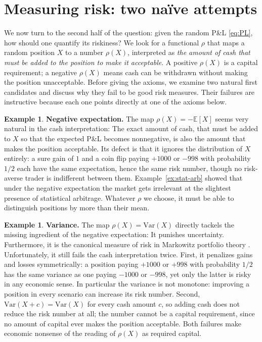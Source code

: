 \documentclass[11pt,a4paper]{report}
\numberwithin{equation}{chapter}
\theoremstyle{plain}
\theoremstyle{definition}
\newtheorem{example}[proposition]{Example}
\newcommand{\E}{\mathbb{E}}
\begin{document}
\section{Measuring risk: two na\"ive attempts}\label{sec:naive}

We now turn to the second half of the question: given the random P\&L \eqref{eq:PL}, how should one quantify its riskiness? We look for a functional $\rho$ that maps a random position $X$ to a number $\rho(X)$, interpreted as \emph{the amount of cash that must be added to the position to make it acceptable}. A positive $\rho(X)$ is a capital requirement; a negative $\rho(X)$ means cash can be withdrawn without making the position unacceptable. Before giving the axioms, we examine two natural first candidates and discuss why they fail to be good risk measures. Their failures are instructive because each one points directly at one of the axioms below.

\begin{example}\label{ex:neg-exp}
    \textbf{Negative expectation.}
    The map $\rho(X)=-\E[X]$ seems very natural in the cash interpretation: The exact amount of cash, that must be added to $X$ so that the expected P\&L becomes nonnegative, is also the amount that makes the position acceptable. Its defect is that it ignores the distribution of $X$ entirely: a sure gain of $1$ and a coin flip paying $+1000$ or $-998$ with probability $1/2$ each have the same expectation, hence the same risk number, though no risk-averse trader is indifferent between them. Example~\ref{ex:stat-arb} showed that under the negative expectation the market gets irrelevant at the slightest presence of statistical arbitrage. Whatever $\rho$ we choose, it must be able to distinguish positions by more than their mean.
\end{example}

\begin{example}\label{ex:variance}
    \textbf{Variance.}
    The map $\rho(X)=\mathrm{Var}(X)$ directly tackels the missing ingredient of the negative expectation: It punishes uncertainty. Furthermore, it is the canonical measure of risk in Markowitz portfolio theory \cite{markowitz1952}. Unfortunately, it still fails the cash interpretation twice. First, it penalizes gains and losses symmetrically: a position paying $+1000$ or $+998$ with probability $1/2$ has the same variance as one paying $-1000$ or $-998$, yet only the latter is risky in any economic sense. In particular the variance is not monotone: improving a position in every scenario can increase its risk number. Second, $\mathrm{Var}(X+c)=\mathrm{Var}(X)$ for every cash amount $c$, so adding cash does not reduce the risk number at all; the number cannot be a capital requirement, since no amount of capital ever makes the position acceptable. Both failures make economic nonsense of the reading of $\rho(X)$ as required capital.
\end{example}
\end{document}
